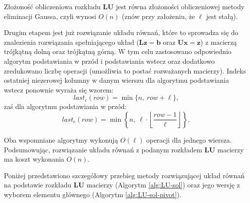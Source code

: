 \documentclass{classrep}
\newcommand{\mL}{\bm{L}}
\newcommand{\mU}{\bm{U}}
\newcommand{\vb}{\bm{b}}
\newcommand{\vx}{\bm{x}}
\newcommand{\vz}{\bm{z}}
\begin{document}
Złożoność obliczeniowa rozkładu $\mL\mU$ jest równa złożoności obliczeniowej metody eliminacji Gaussa, czyli wynosi $O(n)$ (znów przy założeniu, że $\ell$ jest stałą).

	
	Drugim etapem jest już rozwiązanie układu równań, które to sprowadza się do znalezienia rozwiązania spełniającego układ ($\mL \vz = \vb$ oraz $\mU \vx = \vz$) z macierzą trójkątną dolną oraz trójkątną górną. W tym celu zastosowano odpowiednio algorytm podstawiania w przód i podstawiania wstecz oraz dodatkowo zredukowano liczbę operacji (umożliwia to postać rozważanych macierzy). Indeks ostatniej niezerowej kolumny w danym wierszu dla algorytmu podstawiania wstecz ponownie wyraża się wzorem:
	$$
	last_c(row) = \min\{n,~row + \ell\},
	$$
	zaś dla algorytmu podstawiania w przód:
	$$
	last_c(row) = \min\left\lbrace n,~\ell \cdot \left \lfloor\frac{row - 1}{\ell}\right \rfloor\right\rbrace,
	$$
	
	Oba wspomniane algorytmy wykonują $O(\ell)$ operacji dla jednego wiersza. Podsumowując, rozwiązanie układu równań z podanym rozkładem $\bm{LU}$ macierzy ma koszt wykonania $O(n)$.
	
	Poniżej przedstawiono szczegółowy przebieg metody rozwiązującej układ równań na podstawie rozkładu $\bm{LU}$ macierzy (Algorytm \ref{alg:LU-sol}) oraz jego wersję z wyborem elementu głównego (Algorytm \ref{alg:LU-sol-pivot}).
	
\end{document}
